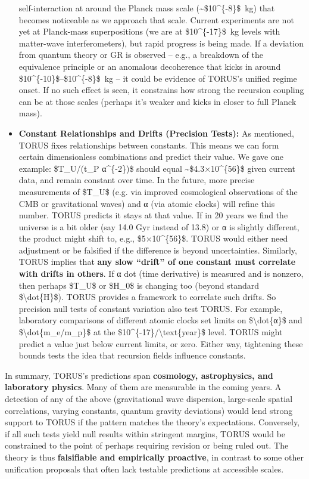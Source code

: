 \documentclass[]{article}
\begin{document}
\begin{itemize}
  self-interaction at around the Planck mass scale
  (\textasciitilde{}\$10\^{}\{-8\}\$~kg) that becomes noticeable as we
  approach that scale​. Current experiments are not yet at Planck-mass
  superpositions (we are at \$10\^{}\{-17\}\$~kg levels with matter-wave
  interferometers), but rapid progress is being made. If a deviation
  from quantum theory or GR is observed -- e.g., a breakdown of the
  equivalence principle or an anomalous decoherence that kicks in around
  \$10\^{}\{-10\}\$--\$10\^{}\{-8\}\$~kg -- it could be evidence of
  TORUS's unified regime onset​. If no such effect is seen, it
  constrains how strong the recursion coupling can be at those scales
  (perhaps it's weaker and kicks in closer to full Planck mass).
\item
  \textbf{Constant Relationships and Drifts (Precision Tests):} As
  mentioned, TORUS fixes relationships between constants. This means we
  can form certain dimensionless combinations and predict their value.
  We gave one example: \$T\_U/(t\_P α\^{}\{-2\})\$ should equal
  \textasciitilde{}\$4.3×10\^{}\{56\}\$​ given current data, and remain
  constant over time. In the future, more precise measurements of
  \$T\_U\$ (e.g. via improved cosmological observations of the CMB or
  gravitational waves) and α (via atomic clocks) will refine this
  number. TORUS predicts it stays at that value. If in 20 years we find
  the universe is a bit older (say 14.0 Gyr instead of 13.8) or α is
  slightly different, the product might shift to, e.g.,
  \$5×10\^{}\{56\}\$. TORUS would either need adjustment or be falsified
  if the difference is beyond uncertainties. Similarly, TORUS implies
  that \textbf{any slow ``drift'' of one constant must correlate with
  drifts in others}. If α dot (time derivative) is measured and is
  nonzero, then perhaps \$T\_U\$ or \$H\_0\$ is changing too (beyond
  standard \$\textbackslash{}dot\{H\}\$). TORUS provides a framework to
  correlate such drifts. So precision null tests of constant variation
  also test TORUS. For example, laboratory comparisons of different
  atomic clocks set limits on \$\textbackslash{}dot\{α\}\$ and
  \$\textbackslash{}dot\{m\_e/m\_p\}\$ at the
  \$10\^{}\{-17\}/\textbackslash{}text\{year\}\$ level. TORUS might
  predict a value just below current limits, or zero. Either way,
  tightening these bounds tests the idea that recursion fields influence
  constants.
\end{itemize}

In summary, TORUS's predictions span \textbf{cosmology, astrophysics,
and laboratory physics}. Many of them are measurable in the coming
years. A detection of any of the above (gravitational wave dispersion,
large-scale spatial correlations, varying constants, quantum gravity
deviations) would lend strong support to TORUS if the pattern matches
the theory's expectations. Conversely, if all such tests yield null
results within stringent margins, TORUS would be constrained to the
point of perhaps requiring revision or being ruled out. The theory is
thus \textbf{falsifiable and empirically proactive}, in contrast to some
other unification proposals that often lack testable predictions at
accessible scales​.
\end{document}
